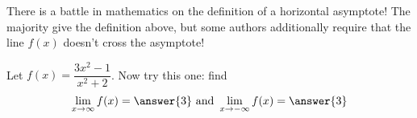 \documentclass{ximera}
\begin{document}
\begin{warning}
There is a battle in mathematics on the definition of a horizontal asymptote! The majority give the definition above, but some authors additionally require that the line $f(x)$ doesn't cross the asymptote!
\end{warning}

\begin{exercise}
\label{exercise:3-24}
Let $f(x)=\dfrac{3x^{2}-1}{x^{2}+2}$. Now try this one: find
\[
\lim _{x \rightarrow \infty} f(x)=\answer{3} \text { and } \lim _{x \rightarrow-\infty} f(x)=\answer{3}
\]
\end{exercise}
\end{document}
